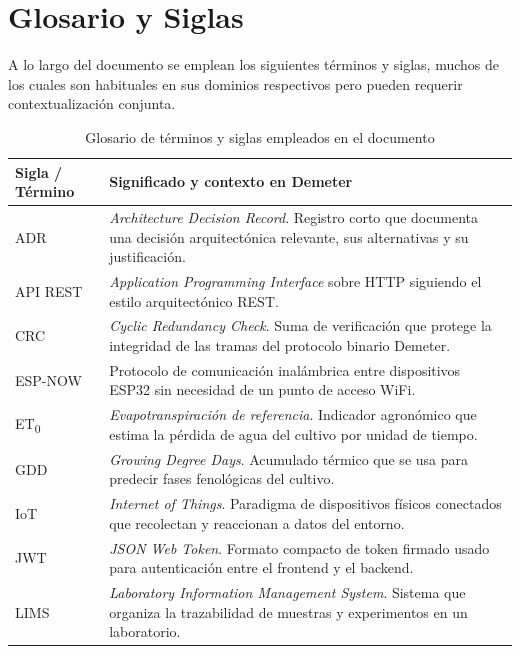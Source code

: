 \section{Glosario y Siglas}

A lo largo del documento se emplean los siguientes términos y siglas, muchos
de los cuales son habituales en sus dominios respectivos pero pueden requerir
contextualización conjunta.

\begin{table}[H]
    \centering
    \caption{Glosario de términos y siglas empleados en el documento}
    \begin{tabularx}{\textwidth}{lX}
        \toprule
        \textbf{Sigla / Término}      & \textbf{Significado y contexto en Demeter} \\
        \midrule
        ADR                            & \textit{Architecture Decision Record}. Registro corto que documenta una decisión arquitectónica relevante, sus alternativas y su justificación. \\
        API REST                       & \textit{Application Programming Interface} sobre HTTP siguiendo el estilo arquitectónico REST. \\
        CRC                            & \textit{Cyclic Redundancy Check}. Suma de verificación que protege la integridad de las tramas del protocolo binario Demeter. \\
        ESP-NOW                        & Protocolo de comunicación inalámbrica entre dispositivos ESP32 sin necesidad de un punto de acceso WiFi. \\
        ET\textsubscript{0}            & \textit{Evapotranspiración de referencia}. Indicador agronómico que estima la pérdida de agua del cultivo por unidad de tiempo. \\
        GDD                            & \textit{Growing Degree Days}. Acumulado térmico que se usa para predecir fases fenológicas del cultivo. \\
        IoT                            & \textit{Internet of Things}. Paradigma de dispositivos físicos conectados que recolectan y reaccionan a datos del entorno. \\
        JWT                            & \textit{JSON Web Token}. Formato compacto de token firmado usado para autenticación entre el frontend y el backend. \\
        LIMS                           & \textit{Laboratory Information Management System}. Sistema que organiza la trazabilidad de muestras y experimentos en un laboratorio. \\

\end{tabularx}
\end{table}
